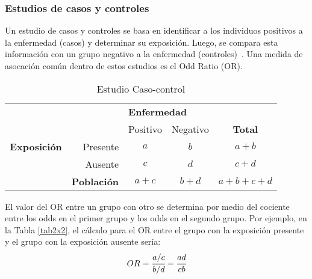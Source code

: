 \newpage


\subsubsection{Estudios de casos y controles}
Un estudio de casos y controles se basa en identificar a los individuos positivos a la enfermedad (casos) y determinar su exposición. Luego, se compara esta información con un grupo negativo a la enfermedad (controles)~\cite{celentano2019gordis}. Una medida de asocación común dentro de estos estudios es el Odd Ratio (OR).
\begin{table}[htbp]
  \caption{Estudio Caso-control}\label{tabcc}
  \centering
    \begin{tabular}{rr|cc|c}
    \toprule
          &       & \multicolumn{2}{l|}{\textbf{Enfermedad}} &  \\
          &       & Positivo & Negativo & \textbf{Total} \\
    \midrule
    \multicolumn{1}{l}{\textbf{Exposición}} & Presente & $a$   & $b$   & $a+b$ \\
          & Ausente & $c$     & $d$     &  $c + d$ \\
    \midrule
          & \textbf{Población} & $a + c$   & $b + d$   & $a+b+c+d$ \\
    \bottomrule
    \end{tabular}%
\end{table}%

El valor del OR entre un grupo con otro se determina por medio del cociente entre los odds en el primer grupo y los odds en el segundo grupo. Por ejemplo, en la Tabla \ref{tab2x2}, el cálculo para el OR entre el grupo con la exposición presente y el grupo con la exposición ausente sería:
\begin{equation*}
    OR=\cfrac{a/c}{b/d}=\cfrac{ad}{cb}
\end{equation*}




